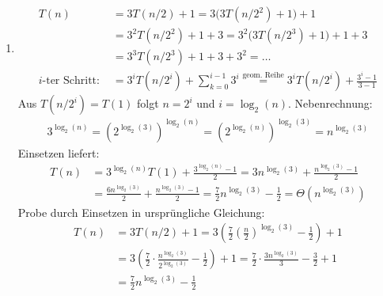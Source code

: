 \documentclass[11pt,a4paper]{article}
\begin{document}
\begin{loesung}
\begin{enumerate}
\begin{enumerate}[label=\roman*)]
    

        \item
        \begin{align*}
            T(n) &= 3T(n / 2) + 1 = 3\big(3T(n / 2^2) + 1\big) + 1 \\
            &= 3^2T(n / 2^2) + 1 + 3 = 3^2\big(3T(n / 2^3) + 1\big) + 1 + 3 \\
            &= 3^3T(n / 2^3) + 1 + 3 + 3^2 = \ldots \\
            \text{$i$-ter Schritt: } &= 3^i T(n / 2^i) + \sum\limits_{k = 0}^{i - 1} 3^i \overset{\text{geom. Reihe}}{=} 
            3^i T(n / 2^i) + \frac{3^{i} - 1}{3 - 1}
        \end{align*}
        Aus $T(n / 2^i) = T(1)$ folgt $n = 2^i$ und $i = \log_2(n)$. Nebenrechnung:
        \begin{align*}
            3^{\log_2(n)} = \left(2^{\log_2(3)}\right)^{\log_2(n)} = 
            \left(2^{\log_2(n)}\right)^{\log_2(3)} = n ^{\log_2(3)}
        \end{align*}
        Einsetzen liefert:
        \begin{align*}
            T(n) &= 3^{\log_2(n)}T(1) + \frac{3^{\log_2(n)} - 1}{2}
            = 3n^{\log_2(3)} + \frac{n^{\log_2(3)} - 1}{2} \\
            &= \frac{6n^{\log_2(3)}}{2} + \frac{n^{\log_2(3)} - 1}{2}
            = \frac{7}{2} n^{\log_2(3)} - \frac{1}{2}
            = \Theta(n^{\log_2(3)})
        \end{align*}
        Probe durch Einsetzen in ursprüngliche Gleichung:
        \begin{align*}
            T(n) &= 3T(n / 2) + 1
            = 3\left( \frac{7}{2} \left(\frac{n}{2}\right)^{\log_2(3)} - \frac{1}{2} \right) + 1 \\
            &= 3\left(\frac{7}{2} \cdot \frac{n^{\log_2(3)}}{2^{\log_2(3)}} - \frac{1}{2}\right) + 1
            = \frac{7}{2} \cdot \frac{3 n^{\log_2(3)}}{3} - \frac{3}{2} + 1 \\
            &= \frac{7}{2} n^{\log_2(3)} - \frac{1}{2}
        \end{align*}


\end{enumerate}
\end{enumerate}
\end{loesung}
\end{document}
